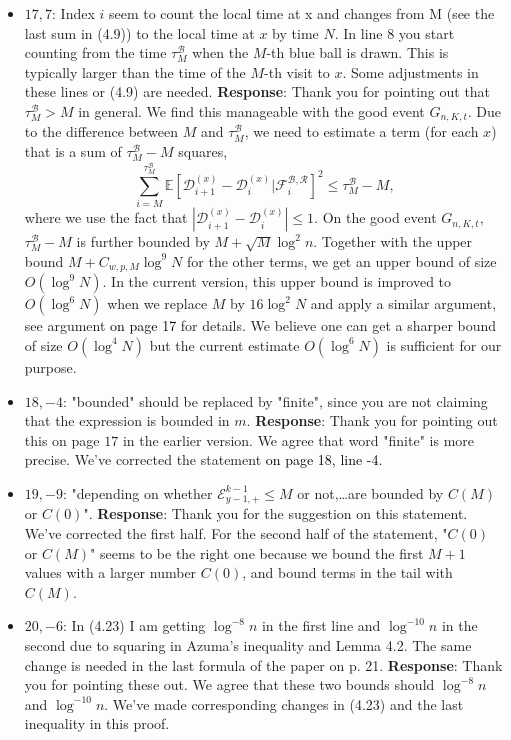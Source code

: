 \documentclass[11pt,a4paper]{article}
\numberwithin{equation}{section}
\newcommand{\abs}[1]{\left\vert #1 \right\vert}
\newcommand{\PL}[2]{\textcolor{black}{on page {#1}, line {#2}}}
\def\TBF#1{\textcolor{black}{#1}} %
\begin{document}
\begin{itemize}
		
		\item
		$17,7$: Index $i$ seem to count the local time at x and changes from M (see the last sum in (4.9)) to the local time at $x$ by time $N$. In line 8 you start counting from the time $\tau_M^{\mathcal{B}}$ when the $M$-th blue ball is drawn. 
		This is typically larger than the time of the $M$-th visit to $x$. Some adjustments in these lines or (4.9) are needed.
		\subitem \textbf{Response}: Thank you for pointing out that $\tau_M^{\mathcal{B}} > M $ in general. We find this manageable with the good event $G_{n,K,t}$. Due to the difference between $M$ and $\tau^{\mathcal{B}}_M$, we need to estimate a 
		term (for each $x$) that is a sum of $\tau^{\mathcal{B}}_M -M$ squares, 
		$$
		\sum_{i = M }^{\tau_M^\mathcal{B}} \mathbb{E}\left[\mathcal{D}^{(x)}_{i+1}-\mathcal{D}^{(x)}_{i} \vert \mathcal{F}_i^{\mathcal{B},\mathcal{R}} \right]^2 \leq \tau_M^\mathcal{B}- M,
		$$
		where we use the fact that $\abs{\mathcal{D}^{(x)}_{i+1}-\mathcal{D}^{(x)}_{i}} \leq 1$. On the good event $G_{n,K,t}$, $\tau_M^\mathcal{B}- M$ is further bounded by $M+\sqrt{M}\log^2 n$. Together with the upper bound $M+C_{w,p,M} \log^9 N$ for the other terms, we get an upper bound of size $O(\log^9 N)$. In the current version, this upper bound is improved to $O(\log^6 N)$ when we replace $M$ by $16\log^2 N$ and apply a similar argument, see argument \TBF{on page 17} for details.
		We believe one can get a sharper bound of size $O(\log^4 N)$ but the current estimate $O(\log^6 N)$ is sufficient for our purpose.
		
		
		\item 
		$18,-4$: "bounded" should be replaced by "finite", since you are not claiming that the expression is bounded in $m$.
		\subitem \textbf{Response}:  Thank you for pointing out this on page $17$ in the earlier version. We agree that word "finite" is more precise.  We've corrected the statement \PL{18}{-4}. 
		
		\item 
		$19,-9$: "depending on whether $\mathcal{E}^{k-1}_{y-1,+} \leq M$ or not,\dots are bounded by $C(M)$ or $C(0)$".
		\subitem \textbf{Response}: Thank you for the suggestion on this statement. We've corrected the first half. For the second half of the statement, "$C(0)$ or $C(M)$" seems to be the right one because we bound the first $M+1$ values with a larger number $C(0)$, and bound terms in the tail with $C(M)$.
		
		\item 
		$20,-6$: In (4.23) I am getting $\log^{-8} n$ in the first line and $\log^{-10} n$ in the second due to squaring in Azuma's inequality and Lemma 4.2. The same change is needed in the last formula of the paper on p. 21.
		\subitem \textbf{Response}:  Thank you for pointing these out. We agree that these two bounds should $\log^{-8} n $ and $\log^{-10} n$. We've made corresponding changes in (4.23) and the last inequality in this proof.
		

\end{itemize}
\end{document}
